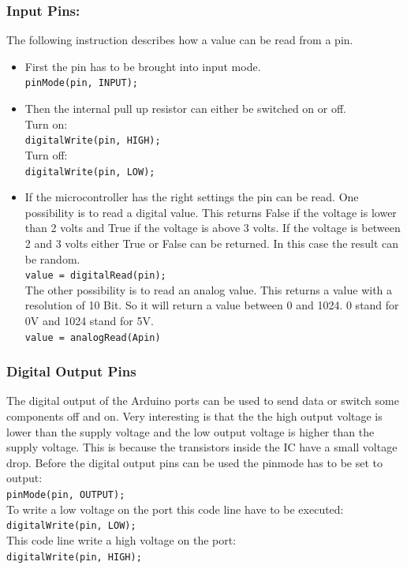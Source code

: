 \subsubsection{Input Pins:} \label{sec:inputPins}
The following instruction describes how a value can be read from a pin.
\begin{itemize}
\item First the pin has to be brought into input mode.\\
\lstinline|pinMode(pin, INPUT);|

\item Then the internal pull up resistor can either be switched on or off.\\
Turn on:\\
\lstinline|digitalWrite(pin, HIGH);|\\
Turn off:\\
\lstinline|digitalWrite(pin, LOW);|\\

\item If the microcontroller has the right settings the pin can be read.
One possibility is to read a digital value.
This returns False if the voltage is lower than 2 volts and True if the voltage is above 3 volts.
If the voltage is between 2 and 3 volts either True or False can be returned.
In this case the result can be random.\\
\lstinline|value = digitalRead(pin);|\\
The other possibility is to read an analog value.
This returns a value with a resolution of 10 Bit.
So it will return a value between 0 and 1024.
0 stand for 0V and 1024 stand for 5V.\\
\lstinline|value = analogRead(Apin)|\\
\end{itemize}

\subsubsection{Digital Output Pins}\label{sec:digitalOutputPins}
The digital output of the Arduino ports can be used to send data or switch some components off and on.
Very interesting is that the the high output voltage is lower than the supply voltage and the low output voltage is higher than the supply voltage.
This is because the transistors inside the IC have a small voltage drop.
Before the digital output pins can be used the pinmode has to be set to output:\\
\lstinline|pinMode(pin, OUTPUT);|\\
To write a low voltage on the port this code line have to be executed:\\
\lstinline|digitalWrite(pin, LOW);|\\
This code line write a high voltage on the port:\\
\lstinline|digitalWrite(pin, HIGH);|\\


